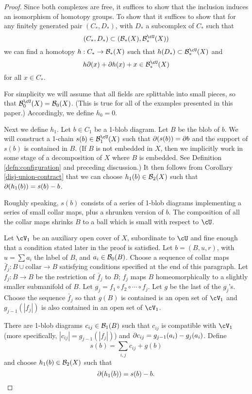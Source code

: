 \begin{proof}
Since both complexes are free, it suffices to show that the inclusion induces
an isomorphism of homotopy groups.
To show that it suffices to show that for any finitely generated 
pair $(C_*, D_*)$, with $D_*$ a subcomplex of $C_*$ such that 
\[
	(C_*, D_*) \sub (\bc_*(X), \sbc_*(X))
\]
we can find a homotopy $h:C_*\to {\mathcal B}_*(X)$ such that $h(D_*) \sub \sbc_*(X)$
and
\[
	h\bd(x) + \bd h(x) + x \in \sbc_*(X)
\]
for all $x\in C_*$.

For simplicity we will assume that all fields are splittable into small pieces, so that
$\sbc_0(X) = \bc_0(X)$.
(This is true for all of the examples presented in this paper.)
Accordingly, we define $h_0 = 0$.

Next we define $h_1$.
Let $b\in C_1$ be a 1-blob diagram.
Let $B$ be the blob of $b$.
We will construct a 1-chain $s(b)\in \sbc_1(X)$ such that $\partial(s(b)) = \partial b$
and the support of $s(b)$ is contained in $B$.
(If $B$ is not embedded in $X$, then we implicitly work in some stage of a decomposition
of $X$ where $B$ is embedded.
See Definition \ref{defn:configuration} and preceding discussion.)
It then follows from Corollary \ref{disj-union-contract} that we can choose
$h_1(b) \in {\mathcal B}_2(X)$ such that $\partial(h_1(b)) = s(b) - b$.

Roughly speaking, $s(b)$ consists of a series of 1-blob diagrams implementing a series
of small collar maps, plus a shrunken version of $b$.
The composition of all the collar maps shrinks $B$ to a ball which is small with respect to $\cU$.

Let $\cV_1$ be an auxiliary open cover of $X$, subordinate to $\cU$ and 
fine enough that a condition stated later in the proof is satisfied.
Let $b = (B, u, r)$, with $u = \sum a_i$ the label of $B$, and $a_i\in {\mathcal B}_0(B)$.
Choose a sequence of collar maps $\bar{f}_j:B\cup\text{collar}\to B$ satisfying conditions 
specified at the end of this paragraph.
Let $f_j:B\to B$ be the restriction of $\bar{f}_j$ to $B$; $f_j$ maps $B$ homeomorphically to 
a slightly smaller submanifold of $B$.
Let $g_j = f_1\circ f_2\circ\cdots\circ f_j$.
Let $g$ be the last of the $g_j$'s.
Choose the sequence $\bar{f}_j$ so that 
$g(B)$ is contained is an open set of $\cV_1$ and
$g_{j-1}(|f_j|)$ is also contained in an open set of $\cV_1$.

There are 1-blob diagrams $c_{ij} \in {\mathcal B}_1(B)$ such that $c_{ij}$ is compatible with $\cV_1$
(more specifically, $|c_{ij}| = g_{j-1}(|f_j|)$)
and $\partial c_{ij} = g_{j-1}(a_i) - g_{j}(a_i)$.
Define
\[
	s(b) = \sum_{i,j} c_{ij} + g(b)
\]
and choose $h_1(b) \in {\mathcal B}_2(X)$ such that 
\[
	\partial(h_1(b)) = s(b) - b .
\]


\end{proof}
